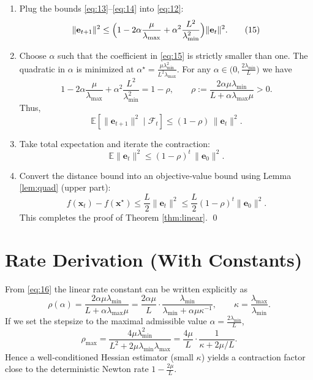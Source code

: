 \documentclass{article}
\newcommand{\E}{\mathbb{E}}
\begin{document}
\begin{enumerate}
\item[Step 6.]  Plug the bounds \eqref{eq:13}–\eqref{eq:14} into \eqref{eq:12}:
\[
\|\mathbf e_{t+1}\|^{2}
\le \Bigl(1-2\alpha\frac{\mu}{\lambda_{\max}}
      +\alpha^{2}\frac{L^{2}}{\lambda_{\min}^{2}}\Bigr)\|\mathbf e_{t}\|^{2}.
\tag{15}
\]

\item[Step 7.]  Choose $\alpha$ such that the coefficient in \eqref{eq:15}
is strictly smaller than one.  The quadratic in $\alpha$ is minimized at
$\alpha^{\star}= \frac{\mu\lambda_{\min}^{2}}{L^{2}\lambda_{\max}}$.
For any $\alpha\in\bigl(0,\frac{2\lambda_{\min}}{L}\bigr)$ we have
\[
1-2\alpha\frac{\mu}{\lambda_{\max}}
      +\alpha^{2}\frac{L^{2}}{\lambda_{\min}^{2}}
= 1-\rho,
\qquad
\rho:=\frac{2\alpha\mu\lambda_{\min}}{L+\alpha\lambda_{\max}\mu}>0 .
\tag{16}
\]
Thus,
\[
\E[\|\mathbf e_{t+1}\|^{2}\mid\mathcal F_{t}]
\le (1-\rho)\,\|\mathbf e_{t}\|^{2}.
\tag{17}
\]

\item[Step 8.]  Take total expectation and iterate the contraction:
\[
\E\|\mathbf e_{t}\|^{2}\le (1-\rho)^{t}\,\|\mathbf e_{0}\|^{2}.
\tag{18}
\]

\item[Step 9.]  Convert the distance bound into an objective‑value bound
using Lemma \ref{lem:quad} (upper part):
\[
f(\mathbf x_{t})-f(\mathbf x^{\star})
\le \frac{L}{2}\|\mathbf e_{t}\|^{2}
\le \frac{L}{2}(1-\rho)^{t}\|\mathbf e_{0}\|^{2}.
\tag{19}
\]
This completes the proof of Theorem \ref{thm:linear}. \qed
\end{enumerate}

\section*{Rate Derivation (With Constants)}
From \eqref{eq:16} the linear rate constant can be written explicitly as
\[
\rho(\alpha)=\frac{2\alpha\mu\lambda_{\min}}
                  {L+\alpha\lambda_{\max}\mu}
          =\frac{2\alpha\mu}{L}\cdot
            \frac{\lambda_{\min}}{\lambda_{\min}+ \alpha\mu\kappa^{-1}},
\qquad\kappa=\frac{\lambda_{\max}}{\lambda_{\min}}.
\]
If we set the stepsize to the maximal admissible value
$\alpha= \frac{2\lambda_{\min}}{L}$,
\[
\rho_{\max}= \frac{4\mu\lambda_{\min}^{2}}
                  {L^{2}+2\mu\lambda_{\min}\lambda_{\max}}
            = \frac{4\mu}{L}\cdot\frac{1}{\kappa+2\mu/L}.
\]
Hence a well‑conditioned Hessian estimator (small $\kappa$) yields a
contraction factor close to the deterministic Newton rate $1-\frac{2\mu}{L}$.
\end{document}
